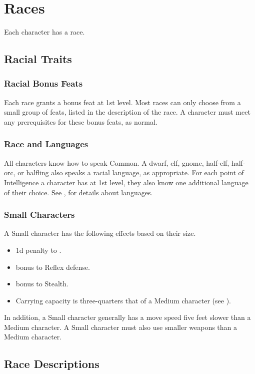 \chapter{Races}\label{Races}

Each character has a race.

\section{Racial Traits}

\subsection{Racial Bonus Feats}
Each race grants a bonus feat at 1st level. Most races can only choose from a small group of feats, listed in the description of the race. A character must meet any prerequisites for these bonus feats, as normal.

\subsection{Race and Languages}
All characters know how to speak Common. A dwarf, elf, gnome, half-elf, half-orc, or halfling also speaks a racial language, as appropriate. For each point of Intelligence a character has at 1st level, they also know one additional language of their choice. See , for details about languages.

\subsection{Small Characters}\label{Small Characters}
A Small character has the following effects based on their size.
  \begin{itemize}
    \item \minus1d penalty to .
    \item {} bonus to Reflex defense.
    \item {} bonus to Stealth.
    \item Carrying capacity is three-quarters that of a Medium character (see ).
  \end{itemize}

In addition, a Small character generally has a move speed five feet slower than a Medium character. A Small character must also use smaller weapons than a Medium character.

\section{Race Descriptions}

